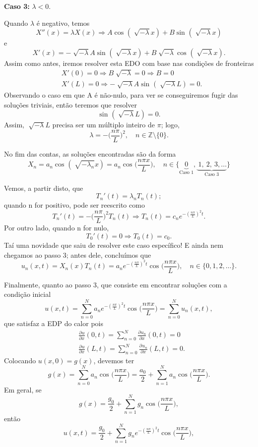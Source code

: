 \documentclass[../pde_notes.tex]{subfiles}
\begin{document}
\begin{example}
	\textbf{Caso 3:} \(\lambda < 0\).

	Quando \(\lambda \) é negativo, temos
	\[
		X''(x)=\lambda X(x)\Rightarrow A\cos^{}{(\sqrt[]{-\lambda }x)}+B\sin^{}{(\sqrt[]{-\lambda }x)}
	\]
	e
	\[
		X'(x)=-\sqrt[]{-\lambda }A\sin^{}{(\sqrt[]{-\lambda }x)} + B\sqrt[]{-\lambda }\cos^{}{(\sqrt[]{-\lambda }x)}.
	\]
	Assim como antes, iremos resolver esta EDO com base nas condições de fronteiras
	\begin{align*}
		 & X'(0)=0 \Rightarrow B\sqrt[]{-\lambda }=0 \Rightarrow B=0                 \\
		 & X'(L)=0 \Rightarrow -\sqrt[]{-\lambda }A\sin^{}{(\sqrt[]{-\lambda }L)}=0.
	\end{align*}
	Observando o caso em que A é não-nulo, para ver se conseguiremos fugir das soluções triviais, então teremos que resolver
	\[
		\sin^{}{(\sqrt[]{-\lambda }L)}=0.
	\]
	Assim, \(\sqrt[]{-\lambda }L\) precisa ser um múltiplo inteiro de \(\pi \); logo,
	\[
		\lambda =-\biggl(\frac{n\pi }{L}\biggr)^{2},\quad n\in \mathbb{Z}\setminus{\{0\}}.
	\]

	No fim das contas, as soluções encontradas são da forma
	\[
		X_{n}=a_{n}\cos^{}{(\sqrt[]{-\lambda_{n}}x)}=a_{n}\cos^{}{\biggl(\frac{n\pi x}{L}\biggr)},\quad n\in \{\underbrace{0}_{\text{Caso 1}},\underbrace{\:1,\:2,\:3,\dotsc }_{\text{Caso 3}}\}
	\]

	Vemos, a partir disto, que
	\[
		T_{n}'(t)=\lambda_{n}T_{n}(t);
	\]
	quando n for positivo, pode ser reescrito como
	\[
		T_{n}'(t)=-\biggl(\frac{n\pi }{L}\biggr)^{2}T_{n}(t) \Rightarrow T_{n}(t)=c_{n}e^{-\left(\frac{n\pi }{L}\right)^{2}t}.
	\]
	Por outro lado, quando n for nulo,
	\[
		T_{0}'(t)=0 \Rightarrow T_{0}(t)=c_{0}.
	\]
	Taí uma novidade que saiu de resolver este caso específico! E ainda nem chegamos ao passo 3; antes dele, concluímos que
	\[
		u_{n}(x, t)=X_{n}(x)T_{n}(t)=a_{n}e^{-\left(\frac{n\pi }{L}\right)^{2}t}\cos^{}{\biggl(\frac{n\pi x}{L}\biggr)},\quad n\in \{0, 1, 2, \dotsc \}.
	\]

	Finalmente, quanto ao {\color{green}passo 3}, que consiste em encontrar soluções com a condição inicial
	\[
		u(x, t)=\sum\limits_{n=0}^{N}a_{n}e^{-\left(\frac{n\pi }{L}\right)^{2}t}\cos^{}{\biggl(\frac{n\pi x}{L}\biggr)}=\sum\limits_{n=0}^{N}u_{n}(x, t),
	\]
	que satisfaz a EDP do calor pois
	\begin{align*}
		 & \frac{\partial^{}u}{\partial x^{}}(0, t)=\sum\limits_{n=0}^{N}\frac{\partial^{}u_{n}}{\partial x^{}}(0, t)=0  \\
		 & \frac{\partial^{}u}{\partial x^{}}(L, t)=\sum\limits_{n=0}^{N}\frac{\partial^{}u_{n}}{\partial x^{}}(L, t)=0.
	\end{align*}
	Colocando \(u(x,0)=g(x)\), devemos ter
	\[
		g(x)=\sum\limits_{n=0}^{N}a_{n}\cos^{}{\biggl(\frac{n\pi x}{L}\biggr)} = \frac{a_{0}}{2}+\sum\limits_{n=1}^{N}a_{n}\cos^{}{\biggl(\frac{n\pi x}{L}\biggr)}.
	\]
	Em geral, se
	\[
		g(x)=\frac{g_{0}}{2}+\sum\limits_{n=1}^{N}g_{n}\cos^{}{\biggl(\frac{n\pi x}{L}\biggr)},
	\]
	então
	\[
		u(x, t)=\frac{g_{0}}{2} + \sum\limits_{n=1}^{N}g_{n}e^{-\left(\frac{n\pi }{L}\right)^{2}t}\cos^{}{\biggl(\frac{n\pi x}{L}\biggr)},
	\]
\end{example}
\end{document}
